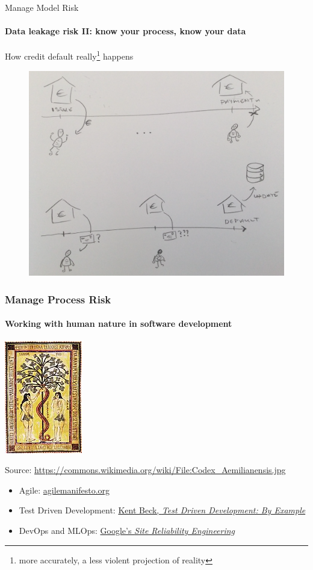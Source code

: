 \begin{frame}{Manage Model Risk}
    \framesubtitle{Data leakage risk II: know your process, know your data}
    How credit default really\footnote{
        more accurately, a less violent projection of reality
    } happens
    \newline
    \begin{figure}[ht]
        \includegraphics[height=0.6\textheight]{graphics/default-process-whole}
    \end{figure}

\end{frame}

\begin{frame}
    \frametitle{Manage Process Risk}
    \framesubtitle{Working with human nature in software development}
    \begin{center}
        \includegraphics[height=0.35\textheight]{graphics/Codex_Aemilianensis}
        \end{center}
        Source: \url{https://commons.wikimedia.org/wiki/File:Codex_Aemilianensis.jpg}
    \begin{itemize}
    \item Agile: \href{https://agilemanifesto.org/}{agilemanifesto.org}
    \item Test Driven Development: \href{https://www.oreilly.com/library/view/test-driven-development/0321146530/}{Kent Beck, {\it Test Driven Development: By Example}}
    \item DevOps and MLOps: \href{https://landing.google.com/sre/books/}{Google's {\it Site Reliability Engineering}}
    \end{itemize}
\end{frame}

